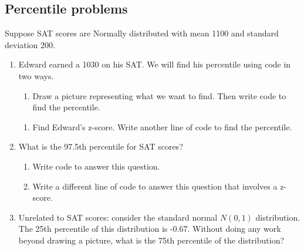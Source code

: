 \documentclass[
  letterpaper,
  DIV=11,
  numbers=noendperiod]{scrartcl}
\providecommand{\tightlist}{%
  \setlength{\itemsep}{0pt}\setlength{\parskip}{0pt}}\usepackage{longtable,booktabs,array}
\begin{document}
\hypertarget{percentile-problems}{%
\subsection{Percentile problems}\label{percentile-problems}}

Suppose SAT scores are Normally distributed with mean 1100 and standard
deviation 200.

\begin{enumerate}
\def\labelenumi{\arabic{enumi}.}
\item
  Edward earned a 1030 on his SAT. We will find his percentile using
  code in two ways.

  \begin{enumerate}
  \def\labelenumii{\alph{enumii}.}
  \tightlist
  \item
    Draw a picture representing what we want to find. Then write code to
    find the percentile.
  \end{enumerate}

  \vspace{3cm}

  \begin{enumerate}
  \def\labelenumii{\alph{enumii}.}
  \setcounter{enumii}{1}
  \item
    Find Edward's z-score. Write another line of code to find the
    percentile.

    \vspace{3cm}
  \end{enumerate}
\item
  What is the 97.5th percentile for SAT scores?

  \begin{enumerate}
  \def\labelenumii{\alph{enumii}.}
  \item
    Write code to answer this question.

    \vspace{2cm}
  \item
    Write a different line of code to answer this question that involves
    a z-score.

    \vspace{3cm}
  \end{enumerate}
\item
  Unrelated to SAT scores: consider the standard normal \(N(0,1)\)
  distribution. The 25th percentile of this distribution is -0.67.
  Without doing any work beyond drawing a picture, what is the 75th
  percentile of the distribution?

  \vspace{3cm}
\end{enumerate}
\end{document}
